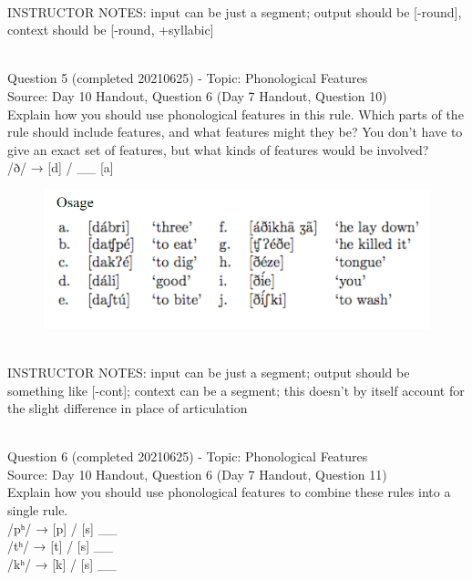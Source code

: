 \documentclass[12pt]{article}
\begin{document}
~\\
INSTRUCTOR NOTES: input can be just a segment; output should be [-round], context should be [-round, +syllabic]


~\\

{\large Question 5} (completed 20210625) - Topic: Phonological Features\\
Source: Day 10 Handout, Question 6 (Day 7 Handout, Question 10)\\

Explain how you should use phonological features in this rule. Which parts of the rule should include features, and what features might they be? You don't have to give an exact set of features, but what kinds of features would be involved?\\

/ð/ → {[d]} / \_\_ {[a]}

\begin{figure}[H]
\includegraphics{../images/osage.png}
\end{figure}

~\\
INSTRUCTOR NOTES: input can be just a segment; output should be something like [-cont]; context can be a segment; this doesn't by itself account for the slight difference in place of articulation


~\\

{\large Question 6} (completed 20210625) - Topic: Phonological Features\\
Source: Day 10 Handout, Question 6 (Day 7 Handout, Question 11)\\

Explain how you should use phonological features to combine these rules into a single rule.\\

/pʰ/ → {[p]} / {[s]} \_\_\\/tʰ/ → {[t]} / {[s]} \_\_\\/kʰ/ → {[k]} / {[s]} \_\_
\end{document}
